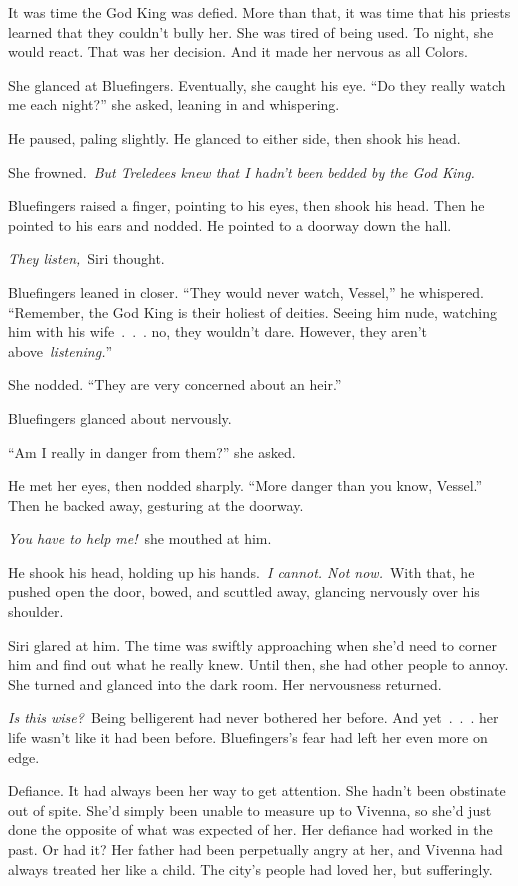 It was time the God King was defied. More than that, it was time that his priests learned that they couldn’t bully her. She was tired of being used. To night, she would react. That was her decision. And it made her nervous as all Colors.

She glanced at Bluefingers. Eventually, she caught his eye. “Do they really watch me each night?” she asked, leaning in and whispering.

He paused, paling slightly. He glanced to either side, then shook his head.

She frowned.~\textit{But Treledees knew that I hadn’t been bedded by the God King.}

Bluefingers raised a finger, pointing to his eyes, then shook his head. Then he pointed to his ears and nodded. He pointed to a doorway down the hall.

\textit{They listen,}~Siri thought.

Bluefingers leaned in closer. “They would never watch, Vessel,” he whispered. “Remember, the God King is their holiest of deities. Seeing him nude, watching him with his wife~.~.~. no, they wouldn’t dare. However, they aren’t above~\textit{listening.}”

She nodded. “They are very concerned about an heir.”

Bluefingers glanced about nervously.

“Am I really in danger from them?” she asked.

He met her eyes, then nodded sharply. “More danger than you know, Vessel.” Then he backed away, gesturing at the doorway.

\textit{You have to help me!}~she mouthed at him.

He shook his head, holding up his hands.~\textit{I cannot. Not now.}~With that, he pushed open the door, bowed, and scuttled away, glancing nervously over his shoulder.

Siri glared at him. The time was swiftly approaching when she’d need to corner him and find out what he really knew. Until then, she had other people to annoy. She turned and glanced into the dark room. Her nervousness returned.

\textit{Is this wise?}~Being belligerent had never bothered her before. And yet~.~.~. her life wasn’t like it had been before. Bluefingers’s fear had left her even more on edge.

Defiance. It had always been her way to get attention. She hadn’t been obstinate out of spite. She’d simply been unable to measure up to Vivenna, so she’d just done the opposite of what was expected of her. Her defiance had worked in the past. Or had it? Her father had been perpetually angry at her, and Vivenna had always treated her like a child. The city’s people had loved her, but sufferingly.

